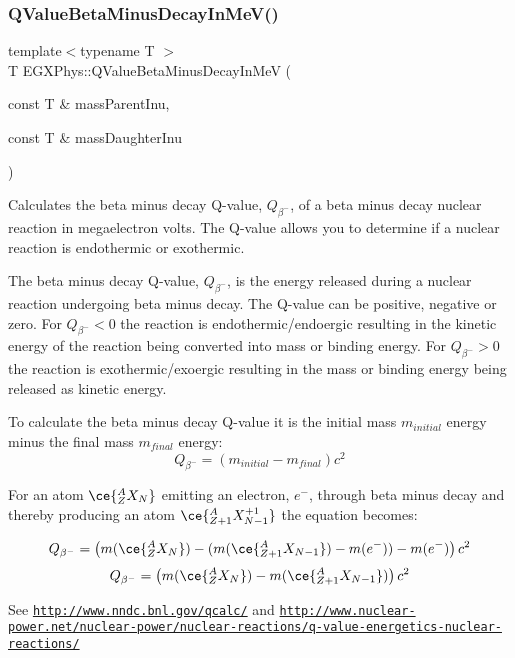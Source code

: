 \subsubsection{\texorpdfstring{Q\+Value\+Beta\+Minus\+Decay\+In\+Me\+V()}{QValueBetaMinusDecayInMeV()}}
{\footnotesize\ttfamily template$<$typename T $>$ \\
T E\+G\+X\+Phys\+::\+Q\+Value\+Beta\+Minus\+Decay\+In\+MeV (\begin{DoxyParamCaption}\item[{const T \&}]{mass\+Parent\+Inu,  }\item[{const T \&}]{mass\+Daughter\+Inu }\end{DoxyParamCaption})}



Calculates the beta minus decay Q-\/value, $Q_{\beta^-}$, of a beta minus decay nuclear reaction in megaelectron volts. The Q-\/value allows you to determine if a nuclear reaction is endothermic or exothermic. 

The beta minus decay Q-\/value, $Q_{\beta^-}$, is the energy released during a nuclear reaction undergoing beta minus decay. The Q-\/value can be positive, negative or zero. For $Q_{\beta^-} < 0$ the reaction is endothermic/endoergic resulting in the kinetic energy of the reaction being converted into mass or binding energy. For $Q_{\beta^-} > 0$ the reaction is exothermic/exoergic resulting in the mass or binding energy being released as kinetic energy.

To calculate the beta minus decay Q-\/value it is the initial mass $m_{initial}$ energy minus the final mass $m_{final}$ energy\+: \[Q_{\beta^-} = \left ( m_{initial}-m_{final}\right ) c^2\]

For an atom $\ce{ ^{A}_{Z}X_{N} }$ emitting an electron, $e^-$, through beta minus decay and thereby producing an atom $\ce{ ^{A}_{Z{+1}}X^{+1}_{N-1} }$ the equation becomes\+:

\[Q_{\beta^-} = \left ( m(\ce{ ^{A}_{Z}X_{N} }) - (m(\ce{ ^{A}_{Z{+1}}X_{N-1} }) - m(e^-)) - m(e^-)\right ) c^2\] \[Q_{\beta^-} = \left ( m(\ce{ ^{A}_{Z}X_{N} }) - m(\ce{ ^{A}_{Z{+1}}X_{N-1} })\right ) c^2\]

See \href{http://www.nndc.bnl.gov/qcalc/}{\tt http\+://www.\+nndc.\+bnl.\+gov/qcalc/} and \href{http://www.nuclear-power.net/nuclear-power/nuclear-reactions/q-value-energetics-nuclear-reactions/}{\tt http\+://www.\+nuclear-\/power.\+net/nuclear-\/power/nuclear-\/reactions/q-\/value-\/energetics-\/nuclear-\/reactions/}

